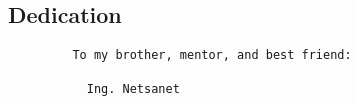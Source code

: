 



\begin{otherlanguage}{american}
	\chapter*{Dedication}
	
	\medskip
	
	\noindent
	
\end{otherlanguage}

\medskip

\begin{verbatim}
	     To my brother, mentor, and best friend:
	       
	       Ing. Netsanet 
\end{verbatim}

